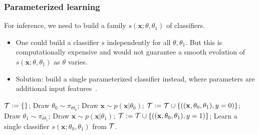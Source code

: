 \documentclass{beamer}
\let\oldcitep=\citep
\renewcommand\citep[1]{\hyperlink{#1}{\oldcitep{#1}}}
\begin{document}
\begin{frame}
    \frametitle{Parameterized learning}

    For inference, we need to build a family $s(\mathbf{x}; \theta, \theta_1)$ of classifiers.

    \begin{itemize}
        \item One could build a classifier $s$ independently for all $\theta, \theta_1$. But this is computationally expensive and would not guarantee a smooth evolution of $s(\mathbf{x}; \theta, \theta_1)$ as $\theta$ varies.

        \item Solution: build a single parameterized classifier instead, where parameters are additional input features~\citep{cranmer2015approximating,Baldi:2016fzo}.
    \end{itemize}

    {\scriptsize
    \begin{algorithmic}
        \State ${\cal T := \{ \}}$;
            \State Draw $\theta_0 \sim \pi_{\Theta_0}$;
    	    \State Draw $\mathbf{x} \sim p(\mathbf{x}|\theta_0)$;
    		\State ${\cal T} := {\cal T} \cup \{ ((\mathbf{x}, \theta_0, \theta_1), y=0) \}$;
            \State Draw $\theta_1 \sim \pi_{\Theta_1}$;
    		\State Draw $\mathbf{x} \sim p(\mathbf{x}|\theta_1)$;
    		\State ${\cal T} := {\cal T} \cup \{ ((\mathbf{x}, \theta_0, \theta_1), y=1) \}$;
        \EndWhile
        \State Learn a single classifier $s(\mathbf{x}; \theta_0, \theta_1)$ from ${\cal T}$.
    \end{algorithmic}}

\end{frame}
\end{document}
